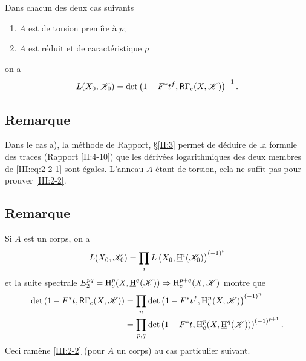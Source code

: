 \documentclass[oneside]{book}
\begin{document}
\begin{theorem_}\label{III:2-2}
Dans chacun des deux cas suivants
\begin{enumerate}[\indent a)]
  \item $A$ est de torsion premi\`re \`a $p$;
  \item $A$ est r\'eduit et de caract\'eristique $p$
\end{enumerate}
on a 
\begin{equation}\label{III:eq:2-2-1}
  L(X_0,\mathscr{K}_0) = \det\left(1-F^* t^f, \mathsf{R}\Gamma_c(X,\mathscr{K})\right)^{-1} \text{.}
\end{equation}
\end{theorem_}





\subsection{Remarque}\label{III:2-3}

Dans le cas a), la m\'ethode de Rapport, \S\ref{II:3} permet de d\'eduire de 
la formule des traces (Rapport \ref{II:4-10}) que les d\'eriv\'ees logarithmiques 
des deux membres de \eqref{III:eq:2-2-1} sont \'egales. L'anneau $A$ \'etant de 
torsion, cela ne suffit pas pour prouver \ref{III:2-2}. 





\subsection{Remarque}\label{III:2-4}

Si $A$ est un corps, on a 
\[
  L(X_0,\mathscr{K}_0) = \prod_i L\left(X_0,\underline{\operatorname{H}}^i(\mathscr{K}_0)\right)^{(-1)^i}
\]
et la suite spectrale 
$E_2^{p q} = \operatorname{H}_c^p(X,\underline{\operatorname{H}}^q(\mathscr{K}))\Rightarrow \operatorname{H}_c^{p+q}(X,\mathscr{K})$ montre 
que 
\begin{align*}
  \det\left(1-F^* t, \mathsf{R}\Gamma_c(X,\mathscr{K})\right) 
    &= \prod_n \det\left(1-F^* t^f,\operatorname{H}_c^n(X,\mathscr{K})\right)^{(-1)^n} \\
    &= \prod_{p,q} \det\left(1-F^* t,\operatorname{H}_c^p(X,\underline{\operatorname{H}}^q(\mathscr{K}))\right)^{(-1)^{p+1}} \text{.}
\end{align*}
Ceci ram\`ene \ref{III:2-2} (pour $A$ un corps) au cas particulier suivant. 


\subsubsection{}\label{III:2-4-1}
\end{document}
